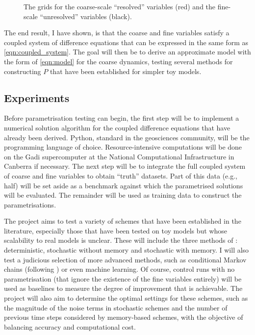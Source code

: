 \documentclass[titlepage]{article}
\begin{document}
\begin{figure}[ht]
    \centering
    
    \caption{
        The grids for the coarse-scale ``resolved'' variables (red) and the
        fine-scale ``unresolved'' variables (black).
    }
    \label{fig:simplegrid}
\end{figure}

The end result, I have shown, is that the coarse and fine variables satisfy
a coupled system of difference equations that can be expressed in the
same form as \autoref{eqn:coupled_system}. The goal will then be to derive
an approximate model with the form of \autoref{eqn:model} for the coarse
dynamics, testing several methods for constructing $P$ that have been
established for simpler toy models.

\subsection{Experiments}
Before parametrisation testing can begin, the first step will be to implement
a numerical solution algorithm for the coupled difference equations that have
already been derived. Python, standard in the geosciences community,
will be the programming language of choice. Resource-intensive computations
will be done on the Gadi supercomputer at the National Computational
Infrastructure in Canberra if necessary.
The next step will be to integrate the full coupled system of coarse and fine
variables to obtain ``truth'' datasets. Part of this data (e.g., half) will be
set aside as a benchmark against which the parametrised solutions will be
evaluated. The remainder will be used as training data to construct the
parametrisations.

The project aims to test a variety of schemes that have been established in the
literature, especially those that have been tested on toy models but whose
scalability to real models is unclear. These will include the three methods of
\textcite{wilks2005}: deterministic, stochastic without memory and stochastic
with memory. I will also test a judicious selection of more advanced methods,
such as conditional Markov chains (following \textcite{crommelin2008}) or even
machine learning. Of course, control runs with no parametrisation (that ignore
the existence of the fine variables entirely) will be used as baselines to
measure the degree of improvement that is achievable. The project will also
aim to determine the optimal settings for these schemes, such as the magnitude
of the noise terms in stochastic schemes and the number of previous time steps
considered by memory-based schemes, with the objective of balancing accuracy
and computational cost.
\end{document}
